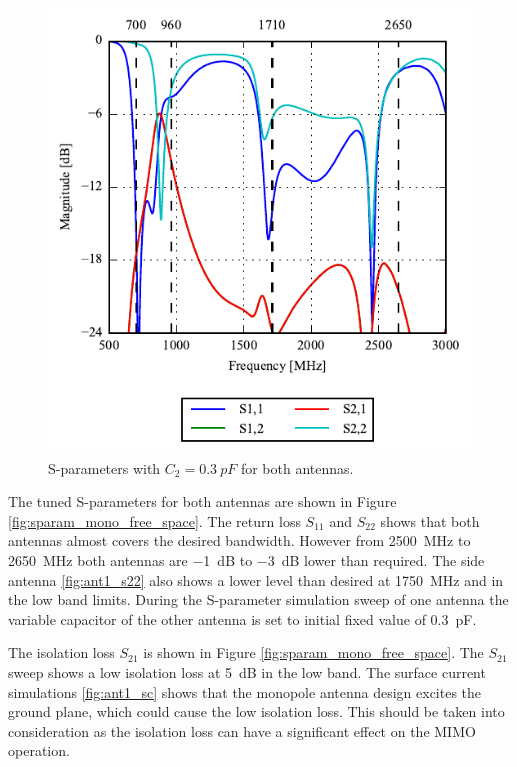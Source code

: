 \begin{figure}[htbp]
    \centering
    \includegraphics{img/tech_sol/monopole/ant1_sparam}
    \caption{S-parameters with $C_2=\SI{0.3}{pF}$ for both antennas.}
    \label{fig:ant1_sparam}
\end{figure}
The tuned S-parameters for both antennas are shown in Figure \ref{fig:sparam_mono_free_space}. The return loss $S_{11}$ and $S_{22}$ shows that both antennas almost covers the desired bandwidth. However from \SI{2500}{MHz} to \SI{2650}{MHz} both antennas are \SI{-1}{dB} to \SI{-3}{dB} lower than required. The side antenna \ref{fig:ant1_s22} also shows a lower level than desired at \SI{1750}{MHz} and in the low band limits. During the S-parameter simulation sweep of one antenna the variable capacitor of the other antenna is set to initial fixed value of \SI{0.3}{pF}. 

The isolation loss $S_{21}$ is shown in Figure \ref{fig:sparam_mono_free_space}. The $S_{21}$ sweep shows a low isolation loss at \SI{5}{dB} in the low band. The surface current simulations \ref{fig:ant1_sc} shows that the monopole antenna design excites the ground plane, which could cause the low isolation loss. This should be taken into consideration as the isolation loss can have a significant effect on the MIMO operation.      


